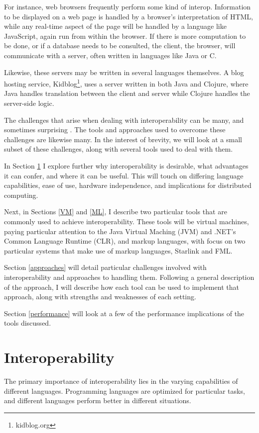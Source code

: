 \documentclass{sig-alternate}
\begin{document}
For instance, web browsers frequently perform some kind of interop. Information to be displayed on a web page is handled by a browser's interpretation of HTML, while any real-time aspect of the page will be handled by a language like JavaScript, again run from within the browser. If there is more computation to be done, or if a database needs to be consulted, the client, the browser, will communicate with a server, often written in languages like Java or C.

Likewise, these servers may be written in several languages themselves. A blog hosting service, Kidblog\footnote{kidblog.org}, uses a server written in both Java and Clojure, where Java handles translation between the client and server while Clojure handles the server-side logic.

The challenges that arise when dealing with interoperability can be many, and sometimes surprising \cite{Chisnall:2013}. The tools and approaches used to overcome these challenges are likewise many. In the interest of brevity, we will look at a small subset of these challenges, along with several tools used to deal with them.

In Section \ref{Interop} I explore further why interoperability is desirable, what advantages it can confer, and where it can be useful. This will touch on differing language capabilities, ease of use, hardware independence, and implications for distributed computing.

Next, in Sections \ref{VM} and \ref{ML}, I describe two particular tools that are commonly used to achieve interoperability. These tools will be virtual machines, paying particular attention to the Java Virtual Maching (JVM) and .NET's Common Language Runtime (CLR), and markup languages, with focus on two particular systems that make use of markup languages, Starlink and FML.

Section \ref{approaches} will detail particular challenges involved with interoperability and approaches to handling them. Following a general description of the approach, I will describe how each tool can be used to implement that approach, along with strengths and weaknesses of each setting.

Section \ref{performance} will look at a few of the performance implications of the tools discussed.


\section{Interoperability}\label{Interop}
The primary importance of interoperability lies in the varying capabilities of different languages. Programming languages are optimized for particular tasks, and different languages perform better in different situations.
\end{document}
